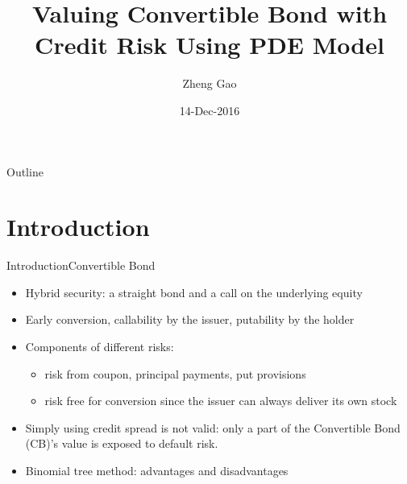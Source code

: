 \documentclass{beamer}
\title[CB pricing \hspace{0.5cm}\insertframenumber/\inserttotalframenumber]{
Valuing Convertible Bond with Credit Risk Using PDE Model}
\author{Zheng Gao}
\institute{Quantitative Pricing and Risk Analytics\\
QPRA}
\date{14-Dec-2016}
\begin{document}
\begin{frame}
  \titlepage
\end{frame}


\begin{frame}{Outline}
  \tableofcontents
\end{frame}

\section{Introduction}
\begin{frame}{Introduction}{Convertible Bond}
	\begin{itemize}
		\item Hybrid security: a straight bond and a call on the underlying equity
		\item Early conversion, 
			  callability by the issuer, putability by the holder
		\item Components of different risks:
			\begin{itemize}
				\item risk from coupon, principal payments, put provisions
				\item risk free for conversion since the issuer can always deliver its own stock
			\end{itemize}  
		\item Simply using credit spread is not valid: only a part of the Convertible Bond (CB)'s value is exposed to default risk.
		\item Binomial tree method: advantages and disadvantages
	\end{itemize}
\end{frame}
\end{document}
